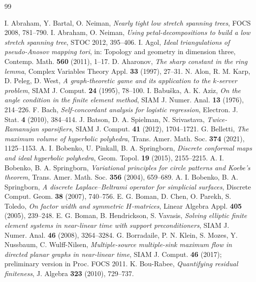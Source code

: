 \documentclass[11pt]{amsart}
\theoremstyle{definition}
\theoremstyle{remark}
\begin{document}
\begin{thebibliography}{99}\small

 I. Abraham, Y. Bartal, O. Neiman, \emph{Nearly tight low stretch spanning trees}, FOCS 2008, 781--790.
 I. Abraham, O. Neiman, \emph{Using petal-decompositions to build a low stretch spanning tree}, STOC 2012, 395--406.
 I. Agol, \emph{Ideal triangulations of pseudo-Anosov mapping tori}, in: Topology and geometry in dimension three, Contemp. Math. \textbf{560} (2011), 1--17.
 D. Aharonov, \emph{The sharp constant in the ring lemma}, Complex Variables Theory Appl. \textbf{33} (1997), 27--31.
 N. Alon, R. M. Karp, D. Peleg, D. West, \emph{A graph-theoretic game and its application to the $k$-server problem}, SIAM J. Comput. \textbf{24} (1995), 78--100.
 I. Babu\v{s}ka, A. K. Aziz, \emph{On the angle condition in the finite element method}, SIAM J. Numer. Anal. \textbf{13} (1976), 214--226.
 F. Bach, \emph{Self-concordant analysis for logistic regression}, Electron. J. Stat. \textbf{4} (2010), 384--414.
 J. Batson, D. A. Spielman, N. Srivastava, \emph{Twice-Ramanujan sparsifiers}, SIAM J. Comput. \textbf{41} (2012), 1704--1721.
 G. Belletti, \emph{The maximum volume of hyperbolic polyhedra}, Trans. Amer. Math. Soc. \textbf{374} (2021), 1125--1153.
 A. I. Bobenko, U. Pinkall, B. A. Springborn, \emph{Discrete conformal maps and ideal hyperbolic polyhedra}, Geom. Topol. \textbf{19} (2015), 2155--2215.
 A. I. Bobenko, B. A. Springborn, \emph{Variational principles for circle patterns and Koebe's theorem}, Trans. Amer. Math. Soc. \textbf{356} (2004), 659--689.
 A. I. Bobenko, B. A. Springborn, \emph{A discrete Laplace--Beltrami operator for simplicial surfaces}, Discrete Comput. Geom. \textbf{38} (2007), 740--756.
 E. G. Boman, D. Chen, O. Parekh, S. Toledo, \emph{On factor width and symmetric $H$-matrices}, Linear Algebra Appl. \textbf{405} (2005), 239--248.
 E. G. Boman, B. Hendrickson, S. Vavasis, \emph{Solving elliptic finite element systems in near-linear time with support preconditioners}, SIAM J. Numer. Anal. \textbf{46} (2008), 3264--3284.
 G. Borradaile, P. N. Klein, S. Mozes, Y. Nussbaum, C. Wulff-Nilsen, \emph{Multiple-source multiple-sink maximum flow in directed planar graphs in near-linear time}, SIAM J. Comput. \textbf{46} (2017); preliminary version in Proc. FOCS 2011.
 K. Bou-Rabee, \emph{Quantifying residual finiteness}, J. Algebra \textbf{323} (2010), 729--737.

\end{thebibliography}
\end{document}
